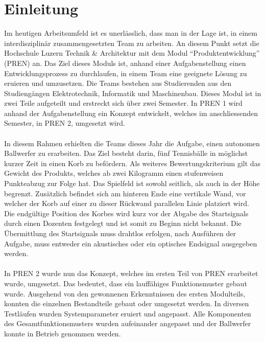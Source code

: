 \section{Einleitung}
Im heutigen Arbeitsumfeld ist es unerlässlich, dass man in der Lage ist, in 
einem interdisziplinär zusammengesetzten Team zu arbeiten. An diesem Punkt 
setzt die Hochschule Luzern Technik \& Architektur mit dem Modul 
\enquote{Produktentwicklung} (PREN) an. Das Ziel dieses Moduls ist, anhand 
einer Aufgabenstellung einen Entwicklungsprozess zu durchlaufen, in einem 
Team eine geeignete Lösung zu eruieren und umzusetzen. Die Teams bestehen 
aus Studierenden aus den Studiengängen Elektrotechnik, Informatik und 
Maschinenbau. Dieses Modul ist in zwei Teile aufgeteilt und erstreckt sich 
über zwei Semester. In PREN 1 wird anhand der Aufgabenstellung ein Konzept 
entwickelt, welches im anschliessenden Semester, in PREN 2, umgesetzt wird.\\
\\
In diesem Rahmen erhielten die Teams dieses Jahr die Aufgabe, einen autonomen 
Ballwerfer zu erarbeiten. Das Ziel besteht darin, fünf Tennisbälle in möglichst 
kurzer Zeit in einen Korb zu befördern. Als weiteres Bewertungskriterium gilt 
das Gewicht des Produkts, welches ab zwei Kilogramm einen stufenweisen 
Punkteabzug zur Folge hat. Das Spielfeld ist sowohl seitlich, als auch in der 
Höhe begrenzt. Zusätzlich befindet sich am hinteren Ende eine vertikale Wand, 
vor welcher der Korb auf einer zu dieser Rückwand parallelen Linie platziert 
wird. Die endgültige Position des Korbes wird kurz vor der Abgabe des Startsignals 
durch einen Dozenten festgelegt und ist somit zu Beginn nicht bekannt. Die 
Übermittlung des Startsignals muss drahtlos erfolgen, nach Ausführen der Aufgabe, 
muss entweder ein akustisches oder ein optisches Endsignal ausgegeben werden.\\
\\
In PREN 2 wurde nun das Konzept, welches im ersten Teil von PREN erarbeitet wurde, 
umgesetzt. Das bedeutet, dass ein lauffähiges Funktionsmuster gebaut wurde. 
Ausgehend von den gewonnenen Erkenntnissen des ersten Modulteils, konnten die 
einzelnen Bestandteile gebaut oder umgesetzt werden. In diversen Testläufen 
wurden Systemparameter eruiert und angepasst. Alle Komponenten des 
Gesamtfunktionsmusters wurden aufeinander angepasst und der Ballwerfer konnte in 
Betrieb genommen werden. 